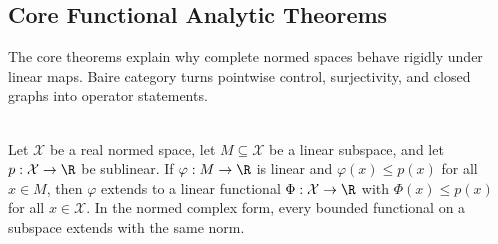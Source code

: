 \subsection{Core Functional Analytic Theorems}

%

The core theorems explain why complete normed spaces behave rigidly under linear maps. Baire category turns pointwise control, surjectivity, and closed graphs into operator statements.

\begin{theorem} \label{thm:hahn-banach-extension} \\
Let $\mathcal{X}$ be a real normed space, let $M\subseteq\mathcal{X}$ be a linear subspace, and let $p:\mathcal{X}\to\R$ be sublinear. If $\varphi:M\to\R$ is linear and $\varphi(x)\leq p(x)$ for all $x\in M$, then $\varphi$ extends to a linear functional $\Phi:\mathcal{X}\to\R$ with $\Phi(x)\leq p(x)$ for all $x\in\mathcal{X}$. In the normed complex form, every bounded functional on a subspace extends with the same norm.
\end{theorem}

